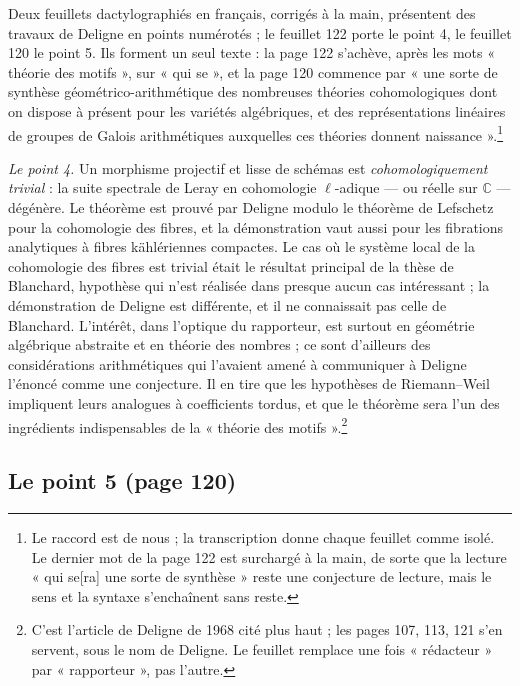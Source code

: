 \documentclass[11pt,a4paper]{article}
\begin{document}
Deux feuillets dactylographiés en français, corrigés à la main, présentent des
travaux de Deligne en points numérotés ; le feuillet 122 porte le point 4, le
feuillet 120 le point 5. Ils forment un seul texte : la page 122 s'achève, après
les mots « théorie des motifs », sur « qui se », et la page 120 commence par « une sorte de
synthèse géométrico-arithmétique des nombreuses théories cohomologiques dont on
dispose à présent pour les variétés algébriques, et des représentations
linéaires de groupes de Galois arithmétiques auxquelles ces théories donnent
naissance ».\footnote{Le raccord est de nous ; la transcription donne chaque
feuillet comme isolé. Le dernier mot de la page 122 est surchargé à la main, de
sorte que la lecture « qui se[ra] une sorte de synthèse » reste une conjecture
de lecture, mais le sens et la syntaxe s'enchaînent sans reste.}

\emph{Le point 4.} Un morphisme projectif et lisse de schémas est
\emph{cohomologiquement trivial} : la suite spectrale de Leray en cohomologie
$\ell$-adique --- ou réelle sur $\mathbb{C}$ --- dégénère. Le théorème est prouvé par
Deligne modulo le théorème de Lefschetz pour la cohomologie des fibres, et la
démonstration vaut aussi pour les fibrations analytiques à fibres kählériennes
compactes. Le cas où le système local de la cohomologie des fibres est trivial
était le résultat principal de la thèse de Blanchard, hypothèse qui n'est réalisée
dans presque aucun cas intéressant ; la démonstration de Deligne est différente,
et il ne connaissait pas celle de Blanchard. L'intérêt, dans l'optique du
rapporteur, est surtout en géométrie algébrique abstraite et en théorie des
nombres ; ce sont d'ailleurs des considérations arithmétiques qui l'avaient amené
à communiquer à Deligne l'énoncé comme une conjecture. Il en tire que les
hypothèses de Riemann--Weil impliquent leurs analogues à coefficients tordus, et
que le théorème sera l'un des ingrédients indispensables de la « théorie des
motifs ».\footnote{C'est l'article de Deligne de 1968 cité plus haut ; les pages
107, 113, 121 s'en servent, sous le nom de Deligne. Le feuillet remplace une fois
« rédacteur » par « rapporteur », pas l'autre.}

\subsection*{Le point 5 (page 120)}
\end{document}
